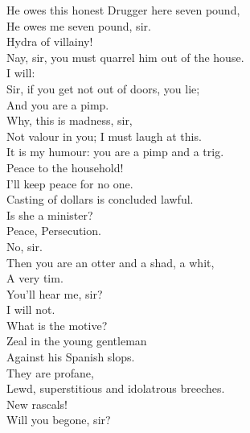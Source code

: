 \documentclass[a4paper,oneside,12pt]{memoir}
\begin{document}
\begin{drama*}
He owes this honest Drugger here seven pound,\\
\druggerspeaks He owes me seven pound, sir.\\
\surlyspeaks {} Hydra of villainy!\\
\facespeaks Nay, sir, you must quarrel him out of the house.\\
\kastrilspeaks {} I will:\\
Sir, if you get not out of doors, you lie;\\
And you are a pimp.\\
\surlyspeaks {} Why, this is madness, sir,\\
Not valour in you; I must laugh at this.\\
\kastrilspeaks It is my humour: you are a pimp and a trig.\\
\persecutionspeaks Peace to the household!\\
\kastrilspeaks {} I'll keep peace for no one.\\
\persecutionspeaks Casting of dollars is concluded lawful.\\
\kastrilspeaks Is she a minister?\\
\subtlespeaks {} Peace, Persecution.\\
\facespeaks No, sir.\\
\kastrilspeaks {} Then you are an otter and a shad, a whit,\\
A very tim.\\
\surlyspeaks {} You'll hear me, sir?\\
\kastrilspeaks {} I will not.\\
\persecutionspeaks What is the motive?\\
\subtlespeaks {} Zeal in the young gentleman\\
Against his Spanish slops.\\
\persecutionspeaks {} They are profane,\\
Lewd, superstitious and idolatrous breeches.\\
\surlyspeaks New rascals!\\
\kastrilspeaks {} Will you begone, sir?\\

\end{drama*}
\end{document}
